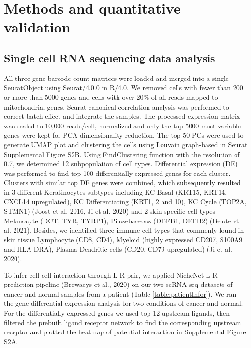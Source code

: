 \section{Methods and quantitative validation}
\label{Sec:2.3_validation}	%
\subsection{Single cell RNA sequencing data analysis}

All three gene-barcode count matrices were loaded and merged into a single SeuratObject using Seurat/4.0.0 in R/4.0. We removed cells with fewer than 200 or more than 5000 genes and cells with over 20\% of all reads mapped to mitochondrial genes. Seurat canonical correlation analysis was performed to correct batch effect and integrate the samples. The processed expression matrix was scaled to 10,000 reads/cell, normalized and only the top 5000 most variable genes were kept for PCA dimensionality reduction. The top 50 PCs were used to generate UMAP plot and clustering the cells using Louvain graph-based in Seurat Supplemental Figure S2B. Using FindClustering function with the resolution of 0.7, we determined 12 subpopulation of cell types. Differential expression (DE) was performed to find top 100 differentially expressed genes for each cluster. Clusters with similar top DE genes were combined, which subsequently resulted in 3 different Keratinocytes subtypes including KC Basal (KRT15, KRT14, CXCL14  upregulated), KC Differentiating (KRT1, 2 and 10), KC Cycle (TOP2A, STMN1)   (Joost et al. 2016, Ji et al. 2020) and 2 skin specific cell types Melanocyte (DCT, TYR, TYRP1), Pilosebaceous (DEFB1, DEFB2) (Belote et al. 2021). Besides, we identified three immune cell types that commonly found in skin tissue  Lymphocyte (CD8, CD4), Myeloid (highly expressed CD207, S100A9 and HLA-DRA), Plasma Dendritic cells (CD20, CD79 upregulated)  (Ji et al. 2020).          

To infer cell-cell interaction through L-R pair, we applied NicheNet L-R prediction pipeline (Browaeys et al., 2020) on our two scRNA-seq datasets of cancer and normal samples from a patient (Table \ref{table:patientInfor}). We ran the gene differential expression analysis for two conditions of cancer and normal. For the differentially expressed genes we used top 12 upstream ligands, then filtered the prebuilt ligand receptor network to find the corresponding upstream receptor and plotted the heatmap of potential interaction in Supplemental Figure S2A.
